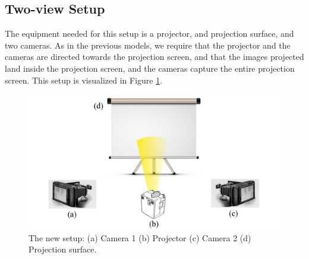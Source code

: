 \documentclass[11pt, oneside, reqno]{book}
\begin{document}
\subsection{Two-view Setup}
\label{ssec:2viewSetup}

The equipment needed for this setup is a projector, and projection surface, and two cameras. As in the previous models, we require that the projector and the cameras are directed towards the projection screen, and that the images projected land inside the projection screen, and the cameras capture the entire projection screen. This setup is visualized in Figure \ref{fig:2viewSetup}.

\begin{figure}[ht]
\centering
\includegraphics[width=.7\linewidth]{data/2view/setup/setup2short2}
\caption{The new setup: (a) Camera 1 (b) Projector (c) Camera 2 (d) Projection surface.}
\label{fig:2viewSetup}
\end{figure}
\end{document}
